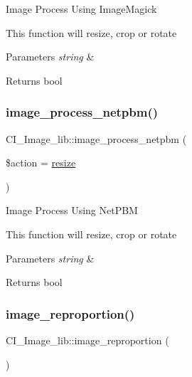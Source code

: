 Image Process Using Image\+Magick

This function will resize, crop or rotate


\begin{DoxyParams}{Parameters}
{\em string} & \\
\hline
\end{DoxyParams}
\begin{DoxyReturn}{Returns}
bool 
\end{DoxyReturn}
\mbox{\label{class_c_i___image__lib_af157d678575e8b8958407097c3e5fd6f}} 
\subsubsection{\texorpdfstring{image\+\_\+process\+\_\+netpbm()}{image\_process\_netpbm()}}
{\footnotesize\ttfamily C\+I\+\_\+\+Image\+\_\+lib\+::image\+\_\+process\+\_\+netpbm (\begin{DoxyParamCaption}\item[{}]{\$action = {\ttfamily \textquotesingle{}\mbox{\hyperlink{class_c_i___image__lib_a661e23a05684c47d1bcdadd088905dbe}{resize}}\textquotesingle{}} }\end{DoxyParamCaption})}

Image Process Using Net\+P\+BM

This function will resize, crop or rotate


\begin{DoxyParams}{Parameters}
{\em string} & \\
\hline
\end{DoxyParams}
\begin{DoxyReturn}{Returns}
bool 
\end{DoxyReturn}
\mbox{\label{class_c_i___image__lib_aae339d063161912b0e01e1edf29cd3eb}} 
\subsubsection{\texorpdfstring{image\+\_\+reproportion()}{image\_reproportion()}}
{\footnotesize\ttfamily C\+I\+\_\+\+Image\+\_\+lib\+::image\+\_\+reproportion (\begin{DoxyParamCaption}{ }\end{DoxyParamCaption})}

